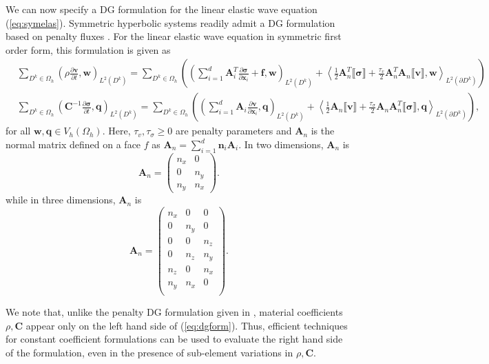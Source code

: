 \documentclass{siamart0216}
\newcommand{\pd}[2]{\frac{\partial#1}{\partial#2}}
\newcommand{\LRp}[1]{\left( #1 \right)}
\newcommand{\LRa}[1]{\left\langle #1 \right\rangle}
\newcommand{\jump}[1] {\ensuremath{\llbracket#1\rrbracket}}
\newcommand{\Oh}{{\Omega_h}}
\newcommand{\Lk}{L^2\LRp{D^k}}
\newcommand{\Ldk}{L^2\LRp{\partial D^k}}
\begin{document}
We can now specify a DG formulation for the linear elastic wave equation (\ref{eq:symelas}).  Symmetric hyperbolic systems readily admit a DG formulation based on penalty fluxes \cite{chan2016short}.  For the linear elastic wave equation in symmetric first order form, this formulation is given as
\begin{align}
&\sum_{D^k\in \Oh} \LRp{\rho \pd{\bm{v}}{t},\bm{w}}_{\Lk} = \sum_{D^k\in \Oh} \LRp{\LRp{ \sum_{i=1}^d \bm{A}_i^T\pd{\bm{\sigma}}{\bm{x}_i} + \bm{f},\bm{w}}_{\Lk}  + \LRa{\frac{1}{2}\bm{A}_n^T\jump{\bm{\sigma}} + \frac{\tau_v}{2}\bm{A}_n^T\bm{A}_n\jump{\bm{v}},\bm{w}}_{\Ldk}} \nonumber\\
&\sum_{D^k\in \Oh} \LRp{\bm{C}^{-1} \pd{\bm{\sigma}}{t},\bm{q}}_{\Lk} = \sum_{D^k\in \Oh}\LRp{\LRp{\sum_{i=1}^d \bm{A}_i \pd{\bm{v}}{\bm{x}_i},\bm{q}}_{\Lk} + \LRa{\frac{1}{2}\bm{A}_n\jump{\bm{v}} + \frac{\tau_{\sigma}}{2}\bm{A}_n\bm{A}_n^T\jump{\bm{\sigma}},\bm{q}}_{\Ldk}},
\label{eq:dgform}
\end{align}
for all $\bm{w},\bm{q}\in V_h\LRp{\Omega_h}$.  Here, $\tau_v,\tau_\sigma \geq 0$ are penalty parameters and $\bm{A}_n$ is the normal matrix defined on a face $f$ as $\bm{A}_n = \sum_{i=1}^d \bm{n}_i \bm{A}_i$.  In two dimensions, $\bm{A}_n$ is 
\[
\bm{A}_n =  \LRp{\begin{array}{cc}
{n}_x & 0\\
 0 & {n}_y\\
{n}_y & {n}_x
\end{array}}.
\]
while in three dimensions, $\bm{A}_n$ is
\[
\bm{A}_n =  \LRp{\begin{array}{ccc}
{n}_x & 0 & 0\\
 0 & {n}_y & 0\\
0&  0 & {n}_z \\
0 &{n}_z & {n}_y\\
{n}_z & 0 & {n}_x\\
{n}_y & {n}_x & 0\\
\end{array}}.  
\]

We note that, unlike the penalty DG formulation given in \cite{ye2016discontinuous}, material coefficients $\rho,\bm{C}$ appear only on the left hand side of (\ref{eq:dgform}).  Thus, efficient techniques for constant coefficient formulations \cite{chan2015bbdg} can be used to evaluate the right hand side of the formulation, even in the presence of sub-element variations in $\rho,\bm{C}$.  
\end{document}
